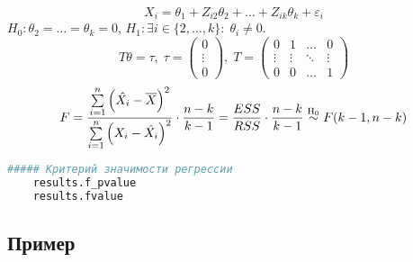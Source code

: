 $$X_i = \theta_1 + Z_{i2}\theta_2 + \dots + Z_{ik}\theta_k + \varepsilon_i$$
$H_0: \theta_2 = \dots = \theta_k = 0$, $H_1: \exists i \in \{2, \dots, k\}: \; \theta_i \not = 0$.
$$T \theta = \tau, \; \tau = 
\begin{pmatrix}
	0 \\ \vdots \\ 0
\end{pmatrix}, \; T = 
\begin{pmatrix}
	0 & 1 & \dots & 0 \\
	\vdots & \vdots & \ddots & \vdots \\
	0 & 0 & \dots & 1	
\end{pmatrix}$$
$$F = \frac{\underset{i=1}{\overset{n}{\sum}}\left( \hat{X_i} - \overline{X} \right)^2}{\underset{i=1}{\overset{n}{\sum}}\left( X_i - \hat{X_i} \right)^2} \cdot \frac{n-k}{k-1} = \frac{ESS}{RSS} \cdot \frac{n-k}{k-1} \mathrel{\stackrel{\rm H_0}\sim} F(k-1, n-k)$$

\begin{lstlisting}[language=Python]
	##### Критерий значимости регрессии
	results.f_pvalue
	results.fvalue
\end{lstlisting}

\subsection*{Пример}\label{cha:linreg/sec:basic/subsec:prob}

